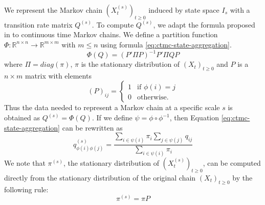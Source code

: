 We represent the Markov chain $(X_t^{(s)})_{t \ge 0}$ induced by state space $I_s$ with a transition
rate matrix $Q^{(s)}$. To compute $Q^{(s)}$, we adapt the formula
proposed in \cite{5746509} to continuous time Markov chains. We define a partition function
$\Phi: \mathbb{R}^{n \times n} \rightarrow \mathbb{R}^{m \times m}$ with $m \le n$ using formula \ref{eq:ctmc-state-aggregation}.
\begin{equation}
	\label{eq:ctmc-state-aggregation}
	\Phi(Q) = (P' \Pi P)^{-1} P' \Pi Q P
\end{equation}
where $\Pi = diag(\pi)$, $\pi$ is the stationary distribution of $(X_t)_{t \ge 0}$ and $P$ is a 
$n \times m$ matrix with elements
\begin{equation}
	\nonumber
	\left(P\right)_{ij} = 
		\left\{
			\begin{array}{ll}
				1 & \mbox{if } \phi(i) = j \\
				0 & \mbox{otherwise}.
			\end{array}
		\right.
\end{equation}
Thus the data needed to represent a Markov chain at a specific scale $s$ is obtained as $Q^{(s)} = \Phi(Q)$.
If we define $\psi = \phi \circ \phi^{-1}$, then Equation \ref{eq:ctmc-state-aggregation} can be rewritten as
\begin{equation}
	\nonumber
	q_{\phi(i)\phi(j)}^{(s)} = \frac{\sum\limits_{i \in \psi(i)}\pi_i \sum\limits_{j \in \psi(j)} q_{ij}}{\sum\limits_{i \in \psi(i)}\pi_i}
\end{equation}
We note that $\pi^{(s)}$, the stationary distribution of $(X_t^{(s)})_{t \ge 0}$, can be computed directly from
the stationary distribution of the original chain $(X_t)_{t \ge 0}$ by the following rule:
\begin{equation}
	\nonumber
	\pi^{(s)} = \pi P
\end{equation}

\iffalse
\newpage

